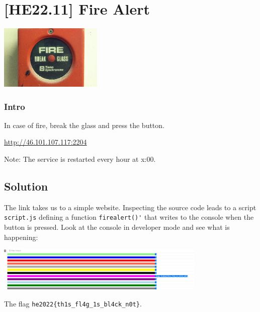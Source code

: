
\hypertarget{he22.11}{%
\chapter{[HE22.11] Fire Alert}\label{he22.11}}

\begin{marginfigure}
	\includegraphics[width=49mm]{level4/challenge11.jpg}
\end{marginfigure}
\subsection{Intro}
In case of fire, break the glass and press the button.

\url{http://46.101.107.117:2204}

Note: The service is restarted every hour at x:00.

\section{Solution}\label{hv22.11solution}

The link takes us to a simple website.  Inspecting the source code leads to a script \verb+script.js+
defining a function \verb+firealert()'+ that writes to the console when the button is pressed.  Look at the console in developer mode and see what is happening:

\includegraphics[width=100mm]{level4/solution11.png}

The flag \verb+he2022{th1s_fl4g_1s_bl4ck_n0t}+.





